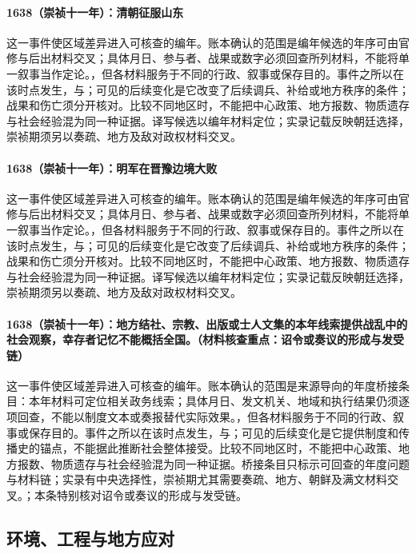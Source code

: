 \paragraph{1638（崇祯十一年）：清朝征服山东} 这一事件使区域差异进入可核查的编年。账本确认的范围是编年候选的年序可由官修与后出材料交叉；具体月日、参与者、战果或数字必须回查所列材料，不能将单一叙事当作定论。，但各材料服务于不同的行政、叙事或保存目的。事件之所以在该时点发生，与；可见的后续变化是它改变了后续调兵、补给或地方秩序的条件；战果和伤亡须分开核对。比较不同地区时，不能把中心政策、地方报数、物质遗存与社会经验混为同一种证据。译写候选以编年材料定位；实录记载反映朝廷选择，崇祯期须另以奏疏、地方及敌对政权材料交叉。

\paragraph{1638（崇祯十一年）：明军在晋豫边境大败} 这一事件使区域差异进入可核查的编年。账本确认的范围是编年候选的年序可由官修与后出材料交叉；具体月日、参与者、战果或数字必须回查所列材料，不能将单一叙事当作定论。，但各材料服务于不同的行政、叙事或保存目的。事件之所以在该时点发生，与；可见的后续变化是它改变了后续调兵、补给或地方秩序的条件；战果和伤亡须分开核对。比较不同地区时，不能把中心政策、地方报数、物质遗存与社会经验混为同一种证据。译写候选以编年材料定位；实录记载反映朝廷选择，崇祯期须另以奏疏、地方及敌对政权材料交叉。

\paragraph{1638（崇祯十一年）：地方结社、宗教、出版或士人文集的本年线索提供战乱中的社会观察，幸存者记忆不能概括全国。（材料核查重点：诏令或奏议的形成与发受链）} 这一事件使区域差异进入可核查的编年。账本确认的范围是来源导向的年度桥接条目：本年材料可定位相关政务线索；具体月日、发文机关、地域和执行结果仍须逐项回查，不能以制度文本或奏报替代实际效果。，但各材料服务于不同的行政、叙事或保存目的。事件之所以在该时点发生，与；可见的后续变化是它提供制度和传播史的锚点，不能据此推断社会整体接受。比较不同地区时，不能把中心政策、地方报数、物质遗存与社会经验混为同一种证据。桥接条目只标示可回查的年度问题与材料链；实录有中央选择性，崇祯期尤其需要奏疏、地方、朝鲜及满文材料交叉。；本条特别核对诏令或奏议的形成与发受链。

\subsection{环境、工程与地方应对}

